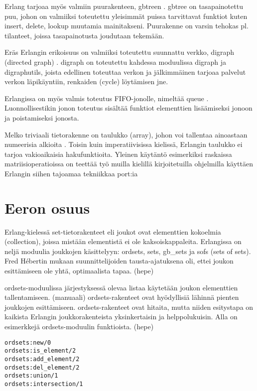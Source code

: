 \documentclass[11pt,oneside,a4paper]{article}
\begin{document}
 Erlang tarjoaa myös valmiin puurakenteen, gb\textunderscore treen \cite{HEB13}.
gb\textunderscore tree on tasapainotettu puu, johon on valmiiksi toteutettu
yleisimmät puissa tarvittavat funktiot kuten insert, delete, lookup muutamia
mainitakseni. Puurakenne on varsin tehokas pl. tilanteet, joissa tasapainotusta
joudutaan tekemään. 
 
 Eräs Erlangin erikoisuus on valmiiksi toteutettu suunnattu verkko, digraph
(directed graph) \cite{HEB13}. digraph on toteutettu kahdessa moduulissa digraph
ja digraph\textunderscore utils, joista edellinen toteuttaa verkon ja
jälkimmäinen tarjoaa palvelut verkon läpikäyntiin, renkaiden (cycle) löytämisen
jne. 
 
 Erlangissa on myös valmis toteutus FIFO-jonolle, nimeltää queue \cite{HEB13}.
Luonnollisestikin jonon toteutus sisältää funktiot elementtien lisäämiseksi
jonoon ja poistamiseksi jonosta. 
 
 Melko triviaali tietorakenne on taulukko (array), johon voi tallentaa
ainoastaan numeerisia alkioita \cite{HEB13}. Toisin kuin imperatiivisissa
kielissä, Erlangin taulukko ei tarjoa vakioaikaisia hakufunktioita. Yleinen
käytäntö esimerkiksi raskaissa matriisioperatioissa on teettää työ muilla
kielillä kirjoitetuilla ohjelmilla käyttäen Erlangin siihen tajoamaa tekniikkaa
port:ia
 

\section{Eeron osuus}

Erlang-kielessä set-tietorakenteet eli joukot ovat elementtien kokoelmia
(collection), joissa mistään elementistä ei ole kaksoiskappaleita. Erlangissa on
neljä moduulia joukkojen käsittelyyn: ordsets, sets, gb\_sets ja sofs (sets of
sets). Fred Hébertin mukaan suunnittelijoiden tausta-ajatuksena oli, ettei
joukon esittämiseen ole yhtä, optimaalista tapaa. (hepe)

ordsets-moduulissa järjestyksessä olevaa listaa käytetään joukon elementtien
tallentamiseen. (manuaali) ordsets-rakenteet ovat hyödyllisiä lähinnä pienten
joukkojen esittämiseen. ordsets-rakenteet ovat hitaita, mutta niiden esitystapa
on kaikista Erlangin joukkorakenteista yksinkertaisin ja helppolukuisin. Alla on
esimerkkejä ordsets-moduulin funktioista. (hepe)

\begin{verbatim}
ordsets:new/0
ordsets:is_element/2
ordsets:add_element/2
ordsets:del_element/2
ordsets:union/1
ordsets:intersection/1
\end{verbatim}
\end{document}
